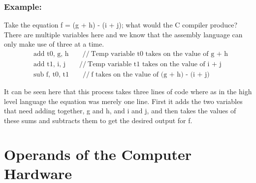 \documentclass[12pt]{article}
\begin{document}
    \subsubsection*{Example:}
    \par Take the equation f = (g + h) - (i + j); what would the C compiler
    produce? There are multiple variables here and we know that the assembly
    language can only make use of three at a time.
    \begin{align*}
        & \text{add t0, g, h}\qquad //\ \text{Temp variable t0 takes on the value of g + h} \\
        & \text{add t1, i, j}\qquad //\ \text{Temp variable t1 takes on the value of i + j} \\
        & \text{sub f, t0, t1}\qquad //\ \text{f takes on the value of (g + h) - (i + j)}
    \end{align*}
    \par It can be seen here that this process takes three lines of code where
    as in the high level language the equation was merely one line. First it
    adds the two variables that need adding together, g and h, and i and j, and
    then takes the values of these sums and subtracts them to get the desired
    output for f.
    \section*{Operands of the Computer Hardware}
\end{document}
